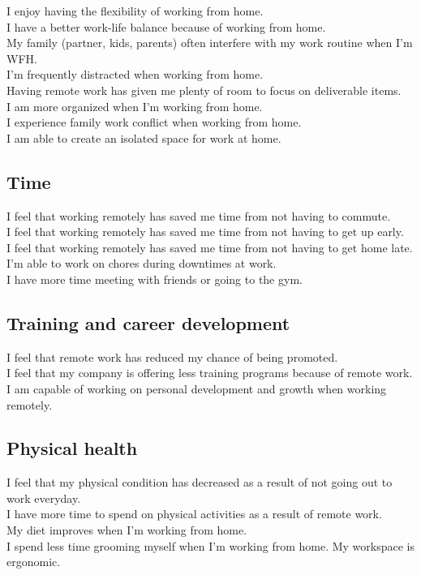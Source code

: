 \documentclass[12pt]{article}
\begin{document}
I enjoy having the flexibility of working from home.  \\
I have a better work-life balance because of working from home. \\
My family (partner, kids, parents) often interfere with my work routine when I’m WFH. \\
I’m frequently distracted when working from home.  \\
Having remote work has given me plenty of room to focus on deliverable items.  \\
I am more organized when I’m working from home.  \\
I experience family work conflict when working from home. \\
I am able to create an isolated space for work at home.

\subsection*{Time} 

I feel that working remotely has saved me time from not having to commute. \\
I feel that working remotely has saved me time from not having to get up early. \\
I feel that working remotely has saved me time from not having to get home late. \\
I’m able to work on chores during downtimes at work.  \\
I have more time meeting with friends or going to the gym.

\subsection*{Training and career development}

I feel that remote work has reduced my chance of being promoted. \\
I feel that my company is offering less training programs because of remote work. \\
I am capable of working on personal development and growth when working remotely.


\subsection*{Physical health}

I feel that my physical condition has decreased as a result of not going out to work everyday.  \\
I have more time to spend on physical activities as a result of remote work. \\
My diet improves when I’m working from home.  \\
I spend less time grooming myself when I’m working from home.
My workspace is ergonomic. 
\end{document}

